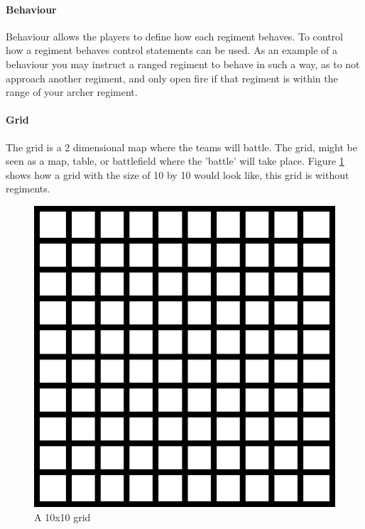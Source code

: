 		\paragraph{Behaviour}
		Behaviour allows the players to define how each regiment behaves. 
		To control how a regiment behaves control statements can be used.
		As an example of a behaviour you may instruct a ranged regiment to behave in such a way, 
		as to not approach another regiment, and only open fire if that regiment is within the range of your archer regiment.
				
		\paragraph{Grid}
		The grid is a 2 dimensional map where the teams will battle.
		The grid, might be seen as a map, table, or battlefield where the 'battle' will take place.
		Figure \ref{fig:grid} shows how a grid with the size of 10 by 10 would look like, this grid is without regiments.
		
		\begin{figure}
		\centering
		\includegraphics[scale=0.25]{rapport/2/figures/grid}
		\caption{ A 10x10 grid } \label{fig:grid}
			\end{figure}		
																				
